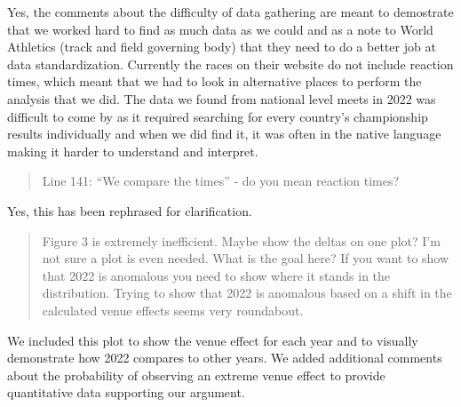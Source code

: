 \documentclass[12pt]{article}
\newenvironment{comment}%
{\begin{quotation}\noindent\small\it\color{darkblue}\ignorespaces%
}{\end{quotation}}
\begin{document}
Yes, the comments about the difficulty of data gathering are meant to demostrate
that we worked hard to find as much data as we could and as a note to World
Athletics (track and field governing body) that they need to do a better job
at data standardization.  Currently the races on their website do not include
reaction times, which meant that we had to look in alternative places to perform
the analysis that we did.  The data we found from national level meets in 2022
was difficult to come by as it required searching for every country's championship
results individually and when we did find it, it was often in the native language
making it harder to understand and interpret.

\begin{comment}
Line 141: “We compare the times” - do you mean reaction times?
\end{comment}

Yes, this has been rephrased for clarification.

\begin{comment}
Figure 3 is extremely inefficient. Maybe show the deltas on one plot? I'm not
sure a plot is even needed. What is the goal here? If you want to show that 2022
is anomalous you need to show where it stands in the distribution. Trying to
show that 2022 is anomalous based on a shift in the calculated venue effects
seems very roundabout.
\end{comment}

We included this plot to show the venue effect for each year and to visually
demonstrate how 2022 compares to other years.  We added additional comments
about the probability of observing an extreme venue effect to provide
quantitative data supporting our argument.




\end{document}
